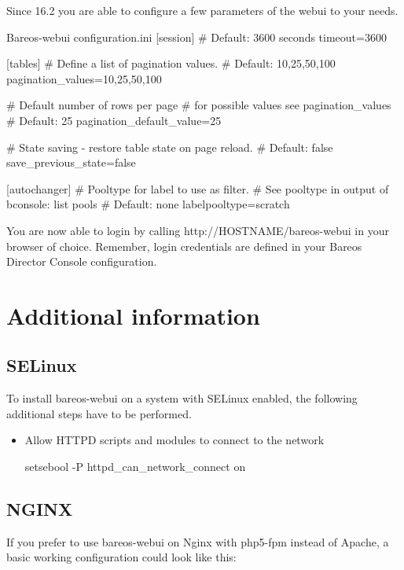 Since 16.2 you are able to configure a few parameters of the webui to your needs.

\begin{bconfig}{Bareos-webui configuration.ini}
[session]
# Default: 3600 seconds
timeout=3600

[tables]
# Define a list of pagination values.
# Default: 10,25,50,100
pagination_values=10,25,50,100

# Default number of rows per page
# for possible values see pagination_values
# Default: 25
pagination_default_value=25

# State saving - restore table state on page reload.
# Default: false
save_previous_state=false

[autochanger]
# Pooltype for label to use as filter.
# See pooltype in output of bconsole: list pools
# Default: none
labelpooltype=scratch
\end{bconfig}

You are now able to login by calling http://HOSTNAME/bareos-webui in your browser of choice. Remember, login credentials are defined in your Bareos Director Console configuration.

\section{Additional information}

\subsection{SELinux}

To install bareos-webui on a system with SELinux enabled, the following additional steps have to be performed.
\begin{itemize}
 \item Allow HTTPD scripts and modules to connect to the network
\begin{commands}{}
setsebool -P httpd_can_network_connect on
\end{commands}
\end{itemize}

\subsection{NGINX}

If you prefer to use bareos-webui on Nginx with php5-fpm instead of Apache,
a basic working configuration could look like this:

